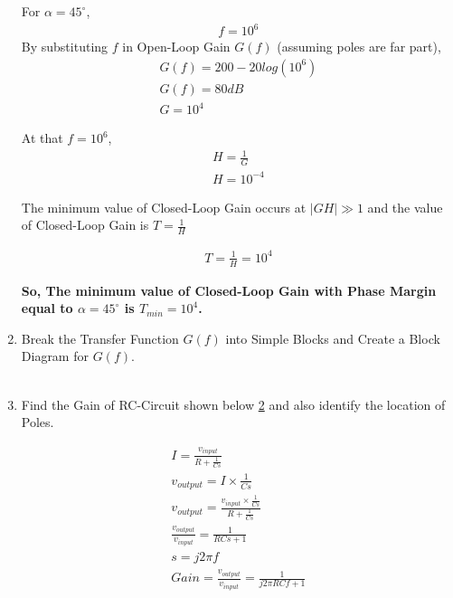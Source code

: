 \begin{enumerate}[label=\thesubsection.\arabic*.,ref=\thesubsection.\theenumi]
For $\alpha=45^{\circ}$,
\begin{align}
f=10^{6}
\end{align}
By substituting $f$ in Open-Loop Gain $G(f)$ (assuming poles are far part), 
\begin{align}
G(f) = 200 - 20log(10^{6})\\
G(f) = 80 dB \\
G = 10^{4}
\end{align}

At that $f = 10^{6}$, 
\begin{align}
H = \frac{1}{G}\\
H = 10^{-4}
\end{align}

The minimum value of Closed-Loop Gain occurs at $|GH| \gg 1$ and the value of Closed-Loop Gain is $T=\frac{1}{H}$

\begin{align}
T = \frac{1}{H} = 10^{4}
\end{align}

\textbf{So, The minimum value of Closed-Loop Gain with Phase Margin equal to $\alpha=45^{\circ}$ is $T_{min} = 10^{4}$.}\\
\item Break the Transfer Function $G(f)$ into Simple Blocks and Create a Block Diagram for $G(f)$.\\
\solution\\
\begin{figure}[ht!]
	\begin{center}
		\resizebox{\columnwidth}{!}{}
	\end{center}
	\caption{}
	\label{fig:RC Circuit}
\end{figure}

\item Find the Gain of RC-Circuit shown below \ref{fig:RC Circuit} and also identify the location of Poles.
\begin{figure}[ht!]
	\begin{center}
		\resizebox{\columnwidth/2}{!}{}
	\end{center}
	\caption{}
	\label{fig:RC Circuit}
\end{figure}

\solution
\begin{align}
I = \frac{v_{input}}{R + \frac{1}{Cs}}\\
v_{output} = I \times \frac{1}{Cs}\\
v_{output} = \frac{v_{input} \times \frac{1}{Cs}}{R + \frac{1}{Cs}}\\
\frac{v_{output}}{v_{input}} = \frac{1}{RCs + 1}\\
s = j2\pi f\\
Gain = \frac{v_{output}}{v_{input}} = \frac{1}{j2\pi RCf + 1}
\end{align}


\end{enumerate}
